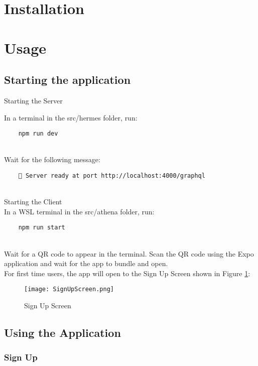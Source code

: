 \documentclass{article}
\begin{document}
\section{Installation}

\section{Usage}

\subsection{Starting the application}

Starting the Server

In a terminal in the src/hermes folder, run:
    \begin{verbatim}
    npm run dev
    \end{verbatim}
\\
Wait for the following message:
    \begin{verbatim}
    🚀 Server ready at port http://localhost:4000/graphql
    \end{verbatim}
\\

Starting the Client\\

In a WSL terminal in the src/athena folder, run:
    \begin{verbatim}
    npm run start
    \end{verbatim}
\\
Wait for a QR code to appear in the terminal. Scan the QR code using the Expo application and wait for the app to bundle and open.\\
For first time users, the app will open to the Sign Up Screen shown in Figure \ref{Fig1}:
\begin{figure}[H]
    \centering
    \texttt{[image: SignUpScreen.png]}
    \caption{Sign Up Screen}
    \label{Fig1}
    \end{figure}


\subsection{Using the Application}

\subsubsection{Sign Up}
\end{document}
